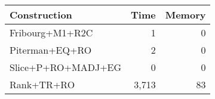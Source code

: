 \begin{table}[ht]
\centering
\begin{tabular}{lrr}
  \hline
Construction & Time & Memory \\ 
  \hline
Fribourg+M1+R2C & 1 & 0 \\ 
  Piterman+EQ+RO & 2 & 0 \\ 
  Slice+P+RO+MADJ+EG & 0 & 0 \\ 
  Rank+TR+RO & 3,713 & 83 \\ 
   \hline
\end{tabular}
\end{table}
